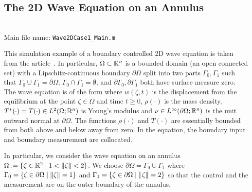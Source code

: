 \documentclass[11pt, a4paper]{amsart}
\theoremstyle{definition}
\numberwithin{equation}{section}
\begin{document}
\medskip


\subsection{The 2D Wave Equation on an Annulus}
~\\[-1ex]

  \noindent Main file name: \texttt{Wave2DCase1\_Main.m}

  \medskip

This simulation example of a boundary controlled 2D wave equation
  is taken from the article~\cite{HumKur19}. In particular, 
  $\Omega\subset{\mathbb{R}}^n$ is a bounded domain (an open connected set) with a Lipschitz-continuous boundary $\partial\Omega$ split into two parts $\Gamma_0,\Gamma_1$ such that $\overline{\Gamma_0}\cup\overline{\Gamma_1}=\partial\Omega$, $\Gamma_0\cap\Gamma_1=\emptyset$, and $\partial\Gamma_0,\partial\Gamma_1$ both have surface measure zero. The wave equation is of the form
  where $w(\zeta,t)$ is the displacement from the equilibrium at the point $\zeta\in\Omega$ and time $t\geq0$, $\rho(\cdot)$ is the mass density, $T^*(\cdot)=T(\cdot)\in L^2(\Omega;{\mathbb{R}}^n)$ is Young's modulus and $\nu\in L^\infty(\partial\Omega;{\mathbb{R}}^n)$ is the unit outward normal at $\partial\Omega$. The functions $\rho(\cdot)$ and $T(\cdot)$ are essentially bounded from both above and below away from zero. In the equation, the boundary input and boundary measurement are collocated.

  In particular, we consider the wave equation on an annulus 
  $\Omega := \{\zeta \in \mathbb{R}^2 \mid 1 < \|\zeta\| < 2\}$. 
  We choose $\partial \Omega = \Gamma_0 \cup \Gamma_1$ where $\Gamma_0 = \{\zeta \in \partial\Omega \mid \|\zeta\| = 1\}$ and $\Gamma_1 = \{\zeta \in \partial\Omega \mid \|\zeta\| = 2\}$ so that the control and the measurement are on the outer boundary of the annulus.
\end{document}

